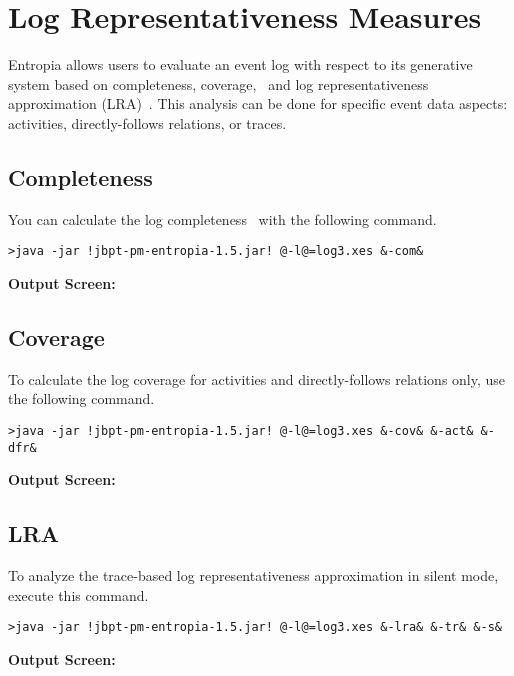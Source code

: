 \section*{Log Representativeness Measures}
\setcounter{subsection}{0}

Entropia allows users to evaluate an event log with respect to
its generative system based on completeness, coverage,~\cite{Kabierski2023Addressing}
and log representativeness approximation (LRA)~\cite{Karunaratne2024Role}.
This analysis can be done for specific event data aspects: activities, directly-follows relations, or traces.

\subsection{Completeness}

You can calculate the log completeness~\cite{Kabierski2023Addressing} with the following command.
\begin{lstlisting}[style=CL]
>java -jar !jbpt-pm-entropia-1.5.jar! @-l@=log3.xes &-com&
\end{lstlisting}

\textbf{Output Screen:}%


\subsection{Coverage}

To calculate the log coverage for activities and directly-follows relations only, use the following command.
\begin{lstlisting}[style=CL]
>java -jar !jbpt-pm-entropia-1.5.jar! @-l@=log3.xes &-cov& &-act& &-dfr&
\end{lstlisting}

\textbf{Output Screen:}%


\subsection{LRA}

To analyze the trace-based log representativeness approximation in silent mode, execute this command.

\begin{lstlisting}[style=CL]
>java -jar !jbpt-pm-entropia-1.5.jar! @-l@=log3.xes &-lra& &-tr& &-s&
\end{lstlisting}

\textbf{Output Screen:}%



